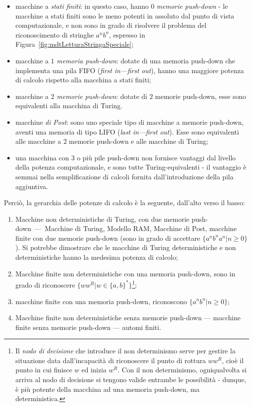 \documentclass[10pt]{book}
\begin{document}
\begin{itemize}
    \item macchine a \emph{stati finiti}: in questo caso, hanno $0$
        \emph{memorie push-down} \-- le macchine a stati finiti sono le meno
        potenti in assoluto dal punto di vista computazionale, e non sono in
        grado di risolvere il problema del riconoscimento di stringhe $a^n
        b^n$, espresso in Figura~\ref{fig:mdtLetturaStringaSpeciale};
    \item macchine a \emph{$1$ memoria push-down}: dotate di una memoria
        push-down che implementa una pila FIFO (\emph{first in\----first out}),
        hanno una maggiore potenza di calcolo rispetto alla macchina a stati
        finiti;
    \item macchine a \emph{$2$ memorie push-down}: dotate di $2$ memorie
        push-down, esse sono equivalenti alla macchina di Turing.
    \item macchine \emph{di Post}: sono uno speciale tipo di macchine a memorie
        push-down, aventi una memoria di tipo LIFO (\emph{last in\----first
        out}). Esse sono equivalenti alle macchine a $2$ memorie push-down e
        alle macchine di Turing;
    \item una macchina con $3$ o più pile push-down non fornisce vantaggi dal
        livello della potenza computazionale, e sono tutte Turing-equivalenti
        \-- il vantaggio è semmai nella semplificazione di calcoli fornita
        dall'introduzione della pila aggiuntiva.
\end{itemize}


Perciò, la gerarchia delle potenze di calcolo è la seguente, dall'alto verso il basso:
\begin{enumerate}
    \item Macchine non deterministiche di Turing, con due memorie
        push-down~\----~Macchine di Turing, Modello RAM, Macchine di Post,
        macchine finite con due memorie push-down (sono in grado di accettare
        $\{a^n b^n a^n| n \geq 0\}$). Si potrebbe dimostrare che le macchine di
        Turing deterministiche e non deterministiche hanno la medesima potenza
        di calcolo; 
    \item Macchine finite non deterministiche con una memoria push-down, sono
        in grado di riconoscere $\{w w^R | w\in\{a,b\}^*\}$\footnote{Il
        \emph{nodo di decisione} che introduce il non determinismo serve per
    gestire la situazione data dall'incapacità di riconoscere il punto di
rottura $ww^R$, cioè il punto in cui finisce $w$ ed inizia $w^R$. Con il non
determinismo, ogniqualvolta si arriva al nodo di decisione si tengono valide
entrambe le possibilità \-- dunque, è più potente della macchina ad una memoria
push-down, ma deterministica.};
    \item macchine finite con una memoria push-down, riconoscono $\{a^n
        b^n|n\geq 0\}$;
    \item Macchine finite non deterministiche senza memorie push-down \----
        macchine finite senza memorie push-down \---- automi finiti.
\end{enumerate}
\end{document}
